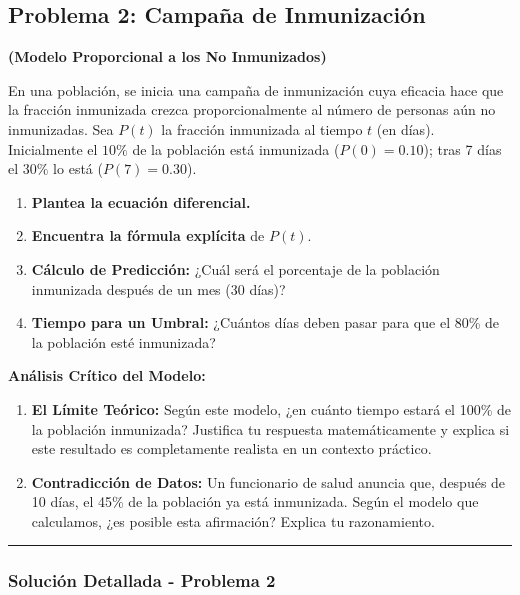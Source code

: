 \documentclass[12pt, a4paper]{article}
\begin{document}
\newpage

\subsection*{Problema 2: Campaña de Inmunización}

\noindent \textbf{(Modelo Proporcional a los No Inmunizados)}

En una población, se inicia una campaña de inmunización cuya eficacia hace que la fracción inmunizada crezca proporcionalmente al número de personas aún no inmunizadas. Sea $P(t)$ la fracción inmunizada al tiempo $t$ (en días). Inicialmente el $10\%$ de la población está inmunizada ($P(0) = 0.10$); tras 7 días el $30\%$ lo está ($P(7) = 0.30$).

\begin{enumerate}[label=\textbf{A\arabic*.},font=\bfseries]
    \item \textbf{Plantea la ecuación diferencial.}
    \item \textbf{Encuentra la fórmula explícita} de $P(t)$.
    \item \textbf{Cálculo de Predicción:} ¿Cuál será el porcentaje de la población inmunizada después de un mes (30 días)?
    \item \textbf{Tiempo para un Umbral:} ¿Cuántos días deben pasar para que el 80\% de la población esté inmunizada?
\end{enumerate}

\noindent \textbf{Análisis Crítico del Modelo:}
\begin{enumerate}[label=\textbf{E\arabic*.},start=1,font=\bfseries]
    \item \textbf{El Límite Teórico:} Según este modelo, ¿en cuánto tiempo estará el 100\% de la población inmunizada? Justifica tu respuesta matemáticamente y explica si este resultado es completamente realista en un contexto práctico.
    \item \textbf{Contradicción de Datos:} Un funcionario de salud anuncia que, después de 10 días, el 45\% de la población ya está inmunizada. Según el modelo que calculamos, ¿es posible esta afirmación? Explica tu razonamiento.
\end{enumerate}

\vspace{1em}
\hrule %
\vspace{1em}

\subsubsection*{Solución Detallada - Problema 2}
\end{document}
